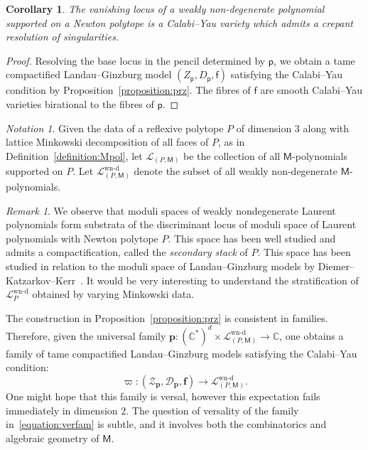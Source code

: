 \documentclass[10pt]{amsart}
\numberwithin{equation}{section}
\theoremstyle{plain}
\newtheorem{corollary}[theorem]{Corollary}
\theoremstyle{definition}
\theoremstyle{remark}
\newtheorem{remark}[theorem]{Remark}
\newtheorem{notation}[theorem]{Notation}
\begin{document}
\begin{corollary}\label{corollary:ade}
  The vanishing locus of a weakly non-degenerate polynomial supported on a Newton polytope is a Calabi--Yau variety which admits a crepant resolution of singularities.
\end{corollary}

\begin{proof}
  Resolving the base locus in the pencil determined by \(\mathsf{p}\), we obtain a tame compactified Landau--Ginzburg model \((Z_\mathsf{p},D_\mathsf{p},\mathsf{f})\) satisfying the Calabi--Yau condition by Proposition~\ref{proposition:prz}. The fibres of \(\mathsf{f}\) are smooth Calabi--Yau varieties birational to the fibres of \(\mathsf{p}\).
\end{proof}

\begin{notation}
  Given the data of a reflexive polytope \(P\) of dimension \(3\) along with lattice Minkowski decomposition of all faces of \(P\), as in Definition~\ref{definition:Mpol}, let \(\mathcal{L}_{(P,\mathsf{M})}\) be the collection of all \(\mathsf{M}\)-polynomials supported on \(P\). Let \(\mathcal{L}^\text{wn-d}_{(P,\mathsf{M})}\) denote the subset of all weakly non-degenerate \(\mathsf{M}\)-polynomials.
\end{notation}

\begin{remark}
  We observe that moduli spaces of weakly nondegenerate Laurent polynomials form substrata of the discriminant locus of moduli space of Laurent polynomials with Newton polytope \(P\). This space has been well studied and admits a compactification, called the \emph{secondary stack} of \(P\). This space has been studied in relation to the moduli space of Landau--Ginzburg models by Diemer--Katzarkov--Kerr~\cite{diemer2016symplectomorphism,diemer2013compactifications}. It would be very interesting to understand the stratification of \(\mathcal{L}^{\text{wn-d}}_P\) obtained by varying Minkowski data.
\end{remark}

The construction in Proposition~\ref{proposition:prz} is consistent in families. Therefore, given the universal family \({\bm p} \colon (\mathbb{C}^*)^d \times \mathcal{L}_{(P,{\mathsf M})}^\text{wn-d}\rightarrow \mathbb{C}\), one obtains a family of tame compactified Landau--Ginzburg models satisfying the Calabi--Yau condition:
\begin{equation}\label{equation:verfam}
\varpi \colon (\mathscr{Z}_{\bm{p}},\mathscr{D}_{\bm{p}},\bm{f})\rightarrow \mathcal{L}^\text{wn-d}_{(P,\mathsf{M})}.
\end{equation}
One might hope that this family is versal, however this expectation fails immediately in dimension \(2\). The question of versality of the family in~\eqref{equation:verfam} is subtle, and it involves both the combinatorics and algebraic geometry of \(\mathsf{M}\).
\end{document}
